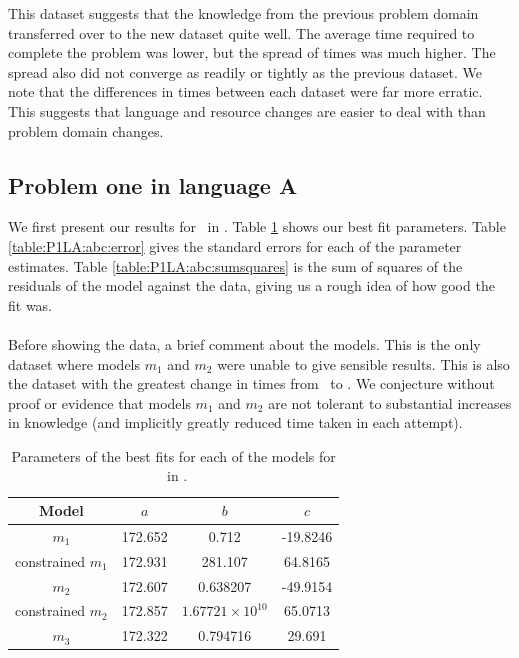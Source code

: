 This dataset suggests that the knowledge from the previous problem domain transferred
over to the new dataset quite well.
The average time required to complete the problem was lower, but the spread of times was much higher.
The spread also did not converge as readily or tightly as the previous dataset.
We note that the differences in times between each dataset were far more erratic.
This suggests that language and resource changes are easier to deal with than problem domain
changes.

\subsection{Problem one in language A} \label{subsecP1LA}

We first present our results for \PO\ in \LA.
Table \ref{table:P1LA:abc} shows our best fit parameters.
Table \ref{table:P1LA:abc:error} gives the standard errors for each of the
parameter estimates.
Table \ref{table:P1LA:abc:sumsquares} is the sum of squares of the residuals of
the model against the data, giving us a rough idea of how good the fit was.\\
\\
Before showing the data, a brief comment about the models.
This is the only dataset where models $m_1$ and $m_2$ were unable to give
sensible results.
This is also the dataset with the greatest change in times from \AZ\ to \ATh.
We conjecture without proof or evidence that models $m_1$ and $m_2$ are not
tolerant to substantial increases in knowledge (and implicitly greatly reduced
time taken in each attempt).

\begin{table}[ht!]
\centering
\begin{tabular}{|c|c|c|c|}
\hline
{\bf Model} &  $a$ & $b$ & $c$ \\
\hline
$m_1$ & 172.652 & 0.712 & -19.8246 \\
\hline
constrained $m_1$ & 172.931 & 281.107 & 64.8165 \\
\hline
$m_2$ & 172.607 & 0.638207 & -49.9154\\
\hline
constrained $m_2$ & 172.857 & $1.67721 \times 10^10$ & 65.0713 \\
\hline
$m_3$ & 172.322 & 0.794716 & 29.691 \\
\hline
\end{tabular}
\caption{Parameters of the best fits for each of the models for \PO\ in \LA.}
\label{table:P1LA:abc}
\end{table}

